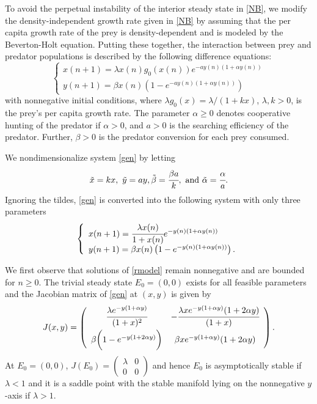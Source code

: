 \documentclass[11pt]{article}
\begin{document}
To avoid the perpetual instability of the interior steady state in
\eqref{NB}, we modify the density-independent growth rate given in
\eqref{NB} by assuming that the per capita growth rate of the prey
is density-dependent and is modeled by the Beverton-Holt equation.
Putting these together, the interaction between prey and predator
populations is described by the following difference equations:
\begin{equation}\label{gen}\left\{\begin{array}{ll}
x(n+1)= \lambda x(n)g_0(x(n))\displaystyle e^{-ay(n)(1+\alpha y(n))}\\[1ex]
y(n+1)=\beta x(n)\left(1-e^{-ay(n)(1+\alpha y(n))}\right)
\end{array}\right.
\end{equation}
with nonnegative initial conditions, where $\lambda
g_0(x)=\lambda/(1+kx)$, $\lambda, k>0$, is the prey's per capita
growth rate. The parameter $\alpha\geq 0$ denotes cooperative
hunting of the predator if $\alpha>0$, and $a>0$ is the searching
efficiency of the predator. Further, $\beta>0$ is the predator
conversion for each prey consumed.

We   nondimensionalize system \eqref{gen} by letting
\begin{equation}\label{dim}\tilde x=kx,\ \tilde y=ay,
\tilde\beta=\cfrac{\beta a}{k}, \mbox{ and } \tilde
\alpha=\cfrac{\alpha}{a}.\end{equation} Ignoring the tildes,
\eqref{gen} is converted into the following system with only three
parameters
\begin{equation}\label{rmodel}\left\{\begin{array}{ll}
x(n+1)= \cfrac{\lambda x(n)}{1+x(n)}\displaystyle e^{-y(n)(1+\alpha y(n))}\\[1ex]
y(n+1)=\beta x(n)\left(1-e^{-y(n)(1+\alpha y(n))}\right).
\end{array}\right.
\end{equation}

We first observe that solutions of \eqref{rmodel} remain
nonnegative and are bounded for $n\geq 0$. The trivial steady
state $E_0=(0,0)$ exists for all feasible parameters and the
Jacobian matrix of \eqref{gen} at $(x,y)$ is given by
\begin{equation}\label{J}J(x,y)=\left(\begin{array} {cc}
\cfrac{\lambda e^{-y(1+\alpha y)}}{(1+x)^2} & -\cfrac{\lambda xe^{-y(1+\alpha y)}(1+2\alpha y)}{(1+x)}\\[2ex]
\beta \bigg(1-e^{-y(1+2\alpha y)}\bigg) & \beta xe^{-y(1+\alpha
y)}(1+2\alpha y)
\end{array}
\right).
\end{equation}
At $E_0=(0,0)$, $J(E_0)=\left(\begin{array}
{cc}
\lambda  & 0\\[1ex]
0 & 0
\end{array}
\right)$ and hence $E_0$ is asymptotically stable if $\lambda<1$
and it is a saddle point with the stable manifold lying on the
nonnegative $y$-axis if $\lambda>1$.
\end{document}
